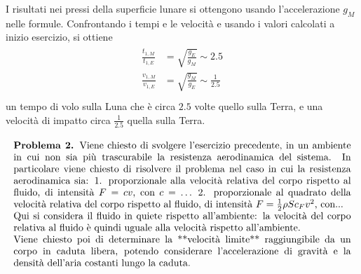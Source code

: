 \documentclass[letterpaper,10pt,italian]{jupyterBook}
\begin{document}
\sphinxAtStartPar
{} I risultati nei pressi della superficie lunare si ottengono usando l’accelerazione \(g_M\) nelle formule.
Confrontando i tempi e le velocità e usando i valori calcolati a inizio esercizio, si ottiene
\begin{equation*}
\begin{split}\begin{aligned}
  \frac{t_{1,M}}{t_{1,E}} & = \sqrt{\frac{g_E}{g_M}} \sim 2.5 \\
  \frac{v_{1,M}}{v_{1,E}} & = \sqrt{\frac{g_M}{g_E}} \sim \frac{1}{2.5} \\
\end{aligned}\end{split}
\end{equation*}
\sphinxAtStartPar
un tempo di volo sulla Luna che è circa \(2.5\) volte quello sulla Terra, e una velocità di impatto circa \(\frac{1}{2.5}\) quella sulla Terra.
\begin{align*}\!\begin{aligned}
\begin{minipage}[t]{1.\textwidth}
  \vspace{0pt}
  \textbf{Problema 2.}
Viene chiesto di svolgere l'esercizio precedente, in un ambiente in cui non sia più trascurabile la resistenza aerodinamica del sistema.
In particolare viene chiesto di risolvere il problema nel caso in cui la resistenza aerodinamica sia:
1. proporzionale alla velocità relativa del corpo rispetto al fluido, di intensità $F = c v$, con $c = \dots$
2. proporzionale al quadrato della velocità relativa del corpo rispetto al fluido, di intensità $F = \frac{1}{2} \rho S c_F v^2$, con...\\
Qui si considera il fluido in quiete rispetto all'ambiente: la velocità del corpo relativa al fluido è quindi uguale alla velocità rispetto all'ambiente.\\
Viene chiesto poi di determinare la **velocità limite** raggiungibile da un corpo in caduta libera, potendo considerare l'accelerazione di gravità e la densità dell'aria costanti lungo la caduta.\\
\end{minipage}\\
\end{aligned}\end{align*}
\sphinxAtStartPar
{}
\end{document}
